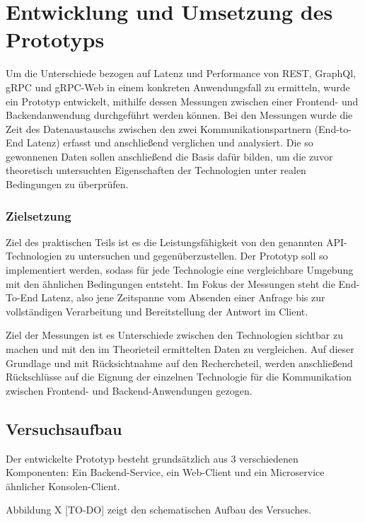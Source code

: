 \chapter{Entwicklung und Umsetzung des Prototyps}
\label{chap:intro}
\chapterstart

Um die Unterschiede bezogen auf Latenz und Performance von REST, GraphQl, gRPC und gRPC-Web in einem konkreten Anwendungsfall zu ermitteln, wurde ein Prototyp entwickelt, mithilfe dessen Messungen zwischen einer Frontend- und Backendanwendung durchgeführt werden können. 
Bei den Messungen wurde die Zeit des Datenaustauschs zwischen den zwei Kommunikationspartnern (End-to-End Latenz) erfasst und anschließend verglichen und analysiert.
Die so gewonnenen Daten sollen anschließend die Basis dafür bilden, 
um die zuvor theoretisch untersuchten Eigenschaften der Technologien unter realen Bedingungen zu überprüfen.

\subsection*{Zielsetzung}
Ziel des praktischen Teils ist es die Leistungsfähigkeit von den genannten API-Technologien zu untersuchen und gegenüberzustellen. Der Prototyp soll so implementiert werden, sodass für jede Technologie eine vergleichbare Umgebung mit den ähnlichen Bedingungen entsteht. 
Im Fokus der Messungen steht die End-To-End Latenz, also jene Zeitspanne vom Absenden einer Anfrage bis zur vollständigen Verarbeitung und Bereitstellung der Antwort im Client. 

Ziel der Messungen ist es Unterschiede zwischen den Technologien sichtbar zu machen und mit den im Theorieteil ermittelten Daten zu vergleichen.
Auf dieser Grundlage und mit Rücksichtnahme auf den Rechercheteil, werden anschließend Rückschlüsse auf die Eignung der einzelnen Technologie für die Kommunikation zwischen Frontend- und Backend-Anwendungen gezogen.


\section{Versuchsaufbau}
Der entwickelte Prototyp besteht grundsätzlich aus 3 verschiedenen Komponenten: 
Ein Backend-Service, ein Web-Client und ein Microservice ähnlicher Konsolen-Client.

Abbildung X [TO-DO] zeigt den schematischen Aufbau des Versuches.

